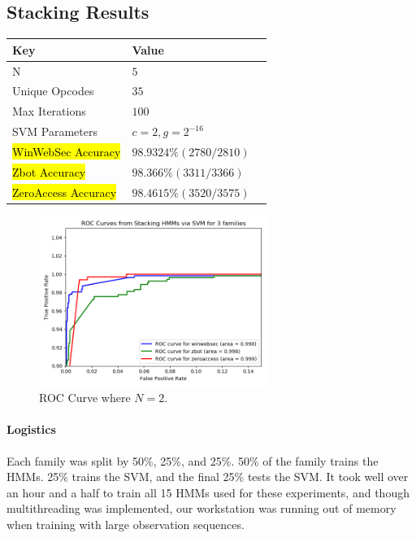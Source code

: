 \documentclass[12pt]{article}
\begin{document}
  \subsection{Stacking Results}
  \begin{table}[H]
    \centering
  \begin{tabular}{|l|l|l|}
    \hline \textbf{Key} & \textbf{Value} \\\hline \hline
  N                   &        $ 5                    $\\\hline
  Unique Opcodes      &        $ 35                   $\\\hline       
  Max Iterations      &        $ 100                  $\\\hline 
  SVM Parameters      &        $ c = 2, g = 2^{-16}   $\\\hline 
  \hl{WinWebSec Accuracy } &   $ 98.9324\% (2780/2810)$\\\hline 
  \hl{Zbot Accuracy      } &   $ 98.366\% (3311/3366) $\\\hline 
  \hl{ZeroAccess Accuracy} &   $ 98.4615\% (3520/3575)$\\\hline 
  \end{tabular}
  \end{table}  

  \begin{figure}[H]
  \centering
  \includegraphics[width=0.66\textwidth]{stacking.png}
  \caption{ROC Curve where $N=2$.}
  \end{figure}
\paragraph{Logistics}
  Each family was split by 50\%, 25\%, and 25\%. 50\% of the family trains the HMMs. 25\% trains the SVM, and the final 25\% tests the SVM. It took well over an hour and a half to train all 15 HMMs used for these experiments, and though multithreading was implemented, our workstation was running out of memory when training with large observation sequences.
\end{document}

